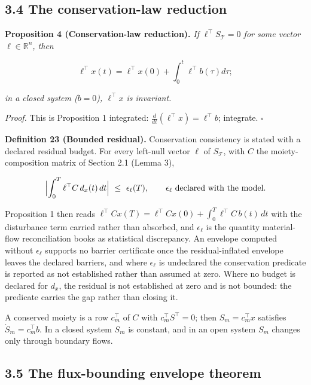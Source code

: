 \documentclass[11pt]{article}
\begin{document}
\subsection*{3.4 The conservation-law reduction}\label{34-the-conservation-law-reduction}

\textbf{Proposition 4 (Conservation-law reduction).} \emph{If \(\ell^\top S_{\mathcal{T}} = 0\) for some vector \(\ell \in \mathbb{R}^n\), then} 

$$\ell^\top x(t) = \ell^\top x(0) + \int_0^t \ell^\top b(\tau) d\tau;$$

 \emph{in a closed system (\(b = 0\)), \(\ell^\top x\) is invariant.}

\emph{Proof.} This is Proposition 1 integrated: \(\frac{d}{dt}(\ell^\top x) =\allowbreak{} \ell^\top b\); integrate. \(\square\)

\textbf{Definition 23 (Bounded residual).} Conservation consistency is stated with a declared residual budget. For every left-null vector \(\ell\) of \(S_{\mathcal{T}}\), with \(C\) the moiety-composition matrix of Section 2.1 (Lemma 3), 

$$\Bigl|\int_0^T\ell^{\top}C\,d_x(t)\,dt\Bigr|\ \le\ \epsilon_\ell(T), \qquad \epsilon_\ell\ \text{declared with the model}.$$

 Proposition 1 then reads \(\ell^{\top}Cx(T)=\allowbreak{}\ell^{\top}Cx(0)+\allowbreak{}\int_0^T\ell^{\top}C\,\allowbreak{}b(t)\,\allowbreak{}dt\) with the disturbance term carried rather than absorbed, and \(\epsilon_\ell\) is the quantity material-flow reconciliation books as statistical discrepancy. An envelope computed without \(\epsilon_\ell\) supports no barrier certificate once the residual-inflated envelope leaves the declared barriers, and where \(\epsilon_\ell\) is undeclared the conservation predicate is reported as not established rather than assumed at zero. Where no budget is declared for \(d_x\), the residual is not established at zero and is not bounded: the predicate carries the gap rather than closing it.

A conserved moiety is a row \(c_m^{\top}\) of \(C\) with \(c_m^{\top}S^{\top}=0\); then \(S_m=c_m^{\top}x\) satisfies \(\dot S_m=c_m^{\top}b\). In a closed system \(S_m\) is constant, and in an open system \(S_m\) changes only through boundary flows.

\subsection*{3.5 The flux-bounding envelope theorem}\label{35-the-flux-bounding-envelope-theorem}
\end{document}
